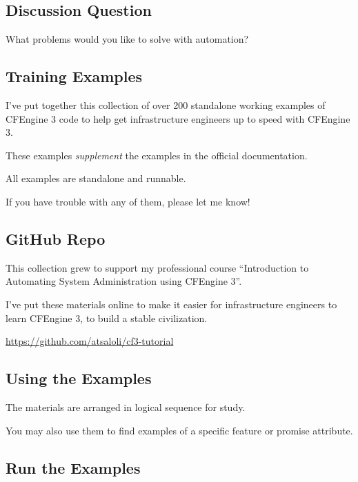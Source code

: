 \subsection{Discussion Question}

What problems would you like to solve with automation?





\subsection{Training Examples}

I've put together this collection of over 200 standalone working examples
of CFEngine 3 code to help get infrastructure engineers up to speed with
CFEngine 3.

These examples \emph{supplement} the examples in the official documentation.

All examples are standalone and runnable.

If you have trouble with any of them, please let me know!





\subsection{GitHub Repo}

This collection grew to support my professional course ``Introduction
to Automating System Administration using CFEngine 3''.

I've put these materials online to make it easier for infrastructure
engineers to learn CFEngine 3, to build a stable civilization.

\href{https://github.com/atsaloli/cf3-tutorial}{https://github.com/atsaloli/cf3-tutorial}





\subsection{Using the Examples}

The materials are arranged in logical sequence for study.

You may also use them to find examples of a specific
feature or promise attribute.





\subsection{Run the Examples}

